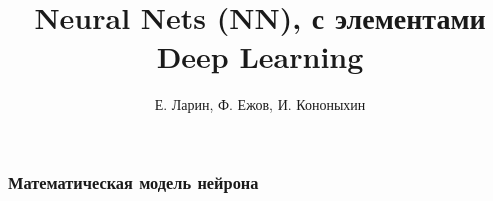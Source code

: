 \documentclass[11pt]{beamer}
\begin{document}
	\author{Е. Ларин, Ф. Ежов, И. Кононыхин }
	\title[Neural Nets]{Neural Nets (NN), с элементами Deep Learning}
	\date{}
	\subject{Семинар по статистическому и машинному обучению}
	
	\begin{frame}[plain]
		\maketitle 
	\end{frame}
	
	\begin{frame}
		\frametitle{Математическая модель нейрона}
		
		\begin{figure}[h]
			\begin{minipage}[h]{0.49\linewidth}
			\end{minipage}
			\hfill
			\begin{minipage}[h]{0.49\linewidth}
			\end{minipage}
		\end{figure}
		
	\end{frame}
\end{document}
